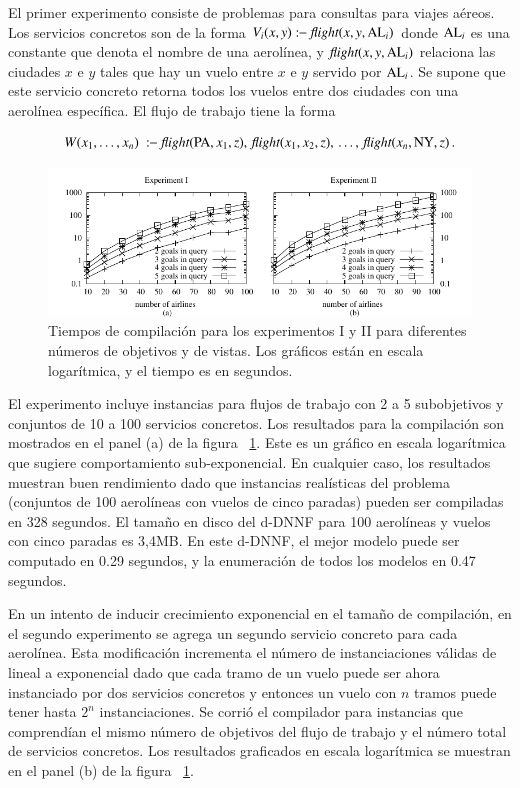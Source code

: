 El primer experimento consiste de problemas para consultas para viajes aéreos.
Los servicios concretos son de la forma $V_i(x,y):\!\!-\ \text{\it flight}(x,y,\text{AL}_i)$
donde $\text{AL}_i$ es una
constante que denota el nombre de una aerolínea, y $\text{\it flight}(x,y,\text{AL}_i)$ relaciona las
ciudades $x$ e $y$ tales que hay un vuelo entre $x$ e $y$ servido por $\text{AL}_i$.
Se supone que este servicio concreto retorna todos los vuelos entre dos ciudades
con una aerolínea específica. El flujo de trabajo tiene la forma

\[ W(x_1,\ldots,x_n)\ \qrule\ \flight(\PA,x_1,z),\,\flight(x_1,x_2,z),\,\ldots,\,\flight(x_n,\NY,z)\,. \]

\begin{figure}[t]
\centering
\includegraphics[width=1\textwidth]{graphics/plot1}
\caption{Tiempos de compilación para los experimentos I y II para diferentes
números de objetivos y de vistas. Los gráficos están en escala logarítmica, y el
tiempo es en segundos.}
\label{fig:plot1}
\end{figure}

El experimento incluye instancias para flujos de trabajo con 2 a 5 subobjetivos
y conjuntos de 10 a 100 servicios concretos. Los resultados para la compilación
son mostrados en el panel (a) de la figura ~\ref{fig:plot1}. Este es un gráfico en escala
logarítmica que sugiere comportamiento sub-exponencial. En cualquier caso, los
resultados muestran buen rendimiento dado que instancias realísticas del
problema (conjuntos de 100 aerolíneas con vuelos de cinco paradas) pueden ser
compiladas en 328 segundos. El tamaño en disco del d-DNNF para 100 aerolíneas y
vuelos con cinco paradas es 3,4MB. En este d-DNNF, el mejor modelo puede ser
computado en 0.29 segundos, y la enumeración de todos los modelos en 0.47
segundos.

En un intento de inducir crecimiento exponencial en el tamaño de compilación, en
el segundo experimento se agrega un segundo servicio concreto para cada
aerolínea. Esta modificación incrementa el número de instanciaciones válidas de
lineal a exponencial dado que cada tramo de un vuelo puede ser ahora instanciado
por dos servicios concretos y entonces un vuelo con $n$ tramos puede tener hasta
$2^n$ instanciaciones. Se corrió el compilador para instancias que comprendían
el mismo número de objetivos del flujo de trabajo y el número total de
servicios concretos. Los resultados graficados en escala logarítmica se muestran
en el panel (b) de la figura ~\ref{fig:plot1}.

